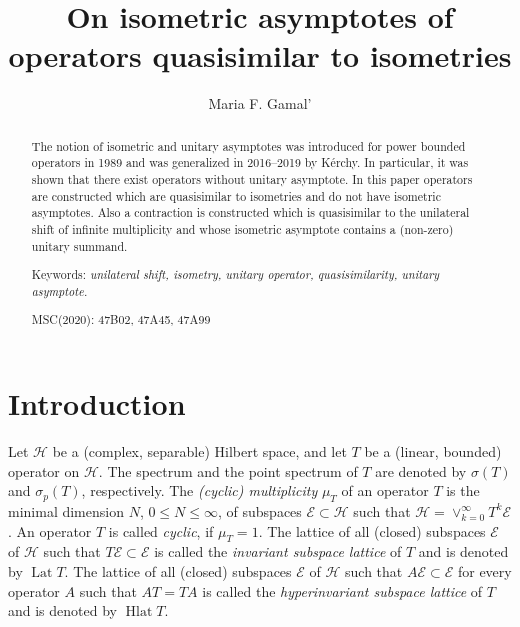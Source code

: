 \documentclass[a4paper,oneside,11pt]{amsart}
\numberwithin{equation}{section}
\theoremstyle{plain}
\theoremstyle{definition}
\begin{document}
\title[On isometric asymptotes]{On isometric asymptotes of operators quasisimilar to isometries}
\author{Maria F. Gamal'}
\address{
 St. Petersburg Branch\\ V. A. Steklov Institute of Mathematics\\
Russian Academy of Sciences\\ Fontanka 27, St. Petersburg\\ 
191023, Russia  }

\maketitle

\begin{abstract}
The notion of isometric and unitary asymptotes was introduced for power bounded operators in 1989  and was  generalized 
in 2016--2019 by  K\'erchy. In particular, it was shown that there exist operators without unitary asymptote. In this paper  operators are constructed which are quasisimilar to  isometries and do not have isometric asymptotes.   
Also a contraction is constructed which is quasisimilar to the unilateral shift of infinite multiplicity and whose  isometric asymptote  contains a (non-zero) unitary summand.  


\noindent Keywords: \emph{unilateral shift, isometry, unitary operator, quasisimilarity, unitary asymptote.}

\noindent MSC(2020): 47B02, 47A45, 47A99
\end{abstract}




\section{Introduction}



Let $\mathcal H$ be a (complex, separable) Hilbert space, and let 
 $T$ be a   (linear, bounded) operator on $\mathcal H$. The spectrum and the point spectrum of $T$ are denoted by
 $\sigma(T)$ and $\sigma_p(T)$, respectively. 
The \emph{(cyclic) multiplicity} $\mu_T$
 of an operator $T$ 
is the minimal dimension $N$, $0\leq N\leq \infty$, of  subspaces $\mathcal E\subset\mathcal H$ such that 
$\mathcal H=\vee_{k=0}^\infty T^k\mathcal E$. An operator $T$ 
is called \emph{cyclic}, if $\mu_T=1$. 
The lattice of all (closed) subspaces $\mathcal E$ of $\mathcal H$ such that $T\mathcal E\subset\mathcal E$ is called 
the \emph{invariant subspace lattice} of $T$ and is denoted by $\operatorname{Lat}T$. 
The lattice of all  (closed) subspaces $\mathcal E$ of $\mathcal H$ such that $A\mathcal E\subset\mathcal E$ 
for every operator $A$ such that $AT=TA$
is called the \emph{hyperinvariant subspace lattice} of $T$ and is denoted by $\operatorname{Hlat}T$. 
\end{document}
